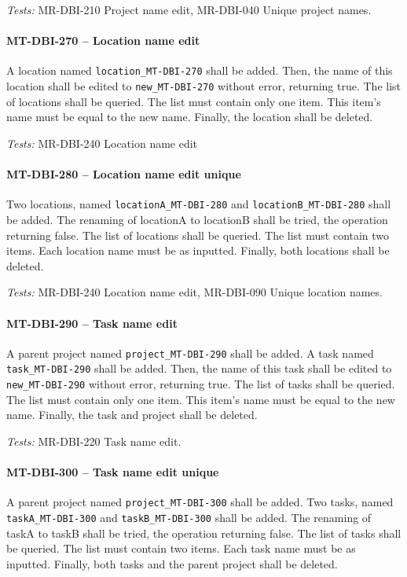 \textit{Tests: } MR-DBI-210 Project name edit, MR-DBI-040 Unique project names.

\paragraph{MT-DBI-270 -- Location name edit}
A location named \lstinline{location_MT-DBI-270} shall be added.
Then, the name of this location shall be edited to \lstinline{new_MT-DBI-270}
without error, returning true.
The list of locations shall be queried. The list must contain only one item.
This item's name must be equal to the new name.
Finally, the location shall be deleted.

\textit{Tests: } MR-DBI-240 Location name edit

\paragraph{MT-DBI-280 -- Location name edit unique}
Two locations, named \lstinline{locationA_MT-DBI-280} and
\lstinline{locationB_MT-DBI-280} shall be added.
The renaming of locationA to locationB shall be tried, the operation
returning false.
The list of locations shall be queried. The list must contain two items.
Each location name must be as inputted.
Finally, both locations shall be deleted.

\textit{Tests: } MR-DBI-240 Location name edit, MR-DBI-090 Unique location
names.

\paragraph{MT-DBI-290 -- Task name edit}
A parent project named \lstinline{project_MT-DBI-290} shall be added.
A task named \lstinline{task_MT-DBI-290} shall be added.
Then, the name of this task shall be edited to \lstinline{new_MT-DBI-290}
without error, returning true.
The list of tasks shall be queried. The list must contain only one item.
This item's name must be equal to the new name.
Finally, the task and project shall be deleted.

\textit{Tests: } MR-DBI-220 Task name edit.

\paragraph{MT-DBI-300 -- Task name edit unique}
A parent project named \lstinline{project_MT-DBI-300} shall be added.
Two tasks, named \lstinline{taskA_MT-DBI-300} and \lstinline{taskB_MT-DBI-300}
shall be added.
The renaming of taskA to taskB shall be tried, the operation returning false.
The list of tasks shall be queried. The list must contain two items.
Each task name must be as inputted.
Finally, both tasks and the parent project shall be deleted.


